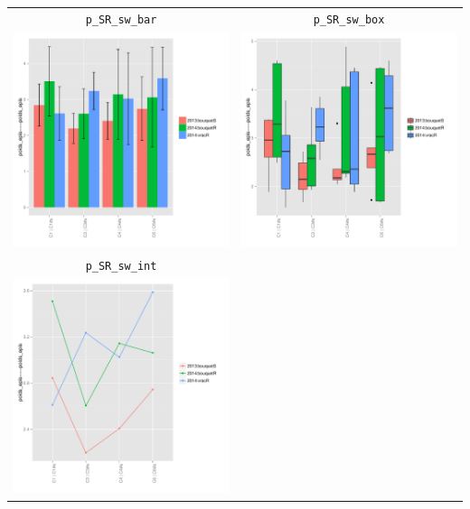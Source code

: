 \documentclass{article}\usepackage[]{graphicx}\usepackage[]{color}
\newenvironment{knitrout}{}{} %
\begin{document}
\begin{center}
\begin{tabular}{cc}
\texttt{p\_SR\_sw\_bar} & \texttt{p\_SR\_sw\_box} \\
\begin{knitrout}
\definecolor{shadecolor}{rgb}{0.969, 0.969, 0.969}\color{fgcolor}

{\centering \includegraphics[width=.4\textwidth]{figures/shinemas2R_unnamed-chunk-100-1} 

}



\end{knitrout}
&
\begin{knitrout}
\definecolor{shadecolor}{rgb}{0.969, 0.969, 0.969}\color{fgcolor}

{\centering \includegraphics[width=.4\textwidth]{figures/shinemas2R_unnamed-chunk-101-1} 

}



\end{knitrout}
\\
\texttt{p\_SR\_sw\_int} & \\
\begin{knitrout}
\definecolor{shadecolor}{rgb}{0.969, 0.969, 0.969}\color{fgcolor}

{\centering \includegraphics[width=.4\textwidth]{figures/shinemas2R_unnamed-chunk-102-1} 

}
\end{knitrout}
\end{tabular}
\end{center}
\end{document}
